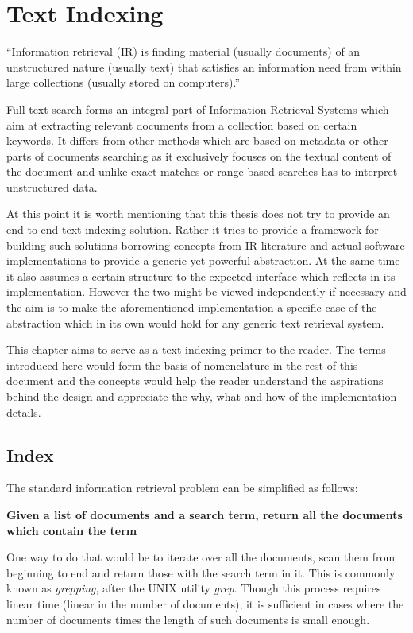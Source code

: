 \chapter{Text Indexing}
\label{chap:textIndexing}

``Information retrieval (IR) is finding material (usually documents) of an unstructured nature (usually text)
that satisfies an information need from within large collections (usually stored on computers).''\cite{IRBook}

Full text search forms an integral part of Information Retrieval Systems which aim at extracting
relevant documents from a collection based on certain keywords.
It differs from other methods which are based on metadata or other parts of documents searching as it exclusively focuses on the
textual content of the document and unlike exact matches or range based searches has to interpret unstructured data.

At this point it is worth mentioning that this thesis does not try to provide an end to end text indexing solution.
Rather it tries to provide a framework for building such solutions borrowing concepts from IR literature and actual software
implementations to provide a generic yet powerful abstraction.
At the same time it also assumes a certain structure to the expected interface which reflects in its implementation.
However the two might be viewed independently if necessary and the aim is to make the aforementioned implementation a specific
case of the abstraction which in its own would hold for any generic text retrieval system.

This chapter aims to serve as a text indexing primer to the reader.
The terms introduced here would form the basis of nomenclature in the rest of this document and
the concepts would help the reader understand the aspirations behind the design and appreciate the why, what and how
of the implementation details.

\section{Index}
The standard information retrieval problem can be simplified as follows:

\noindent \textbf{Given a list of documents and a search term, return all the documents which contain the term}

One way to do that would be to iterate over all the documents, scan them from beginning to end and return those with the search term in it.
This is commonly known as \textit{grepping}, after the UNIX utility \textit{grep}.
Though this process requires linear time (linear in the number of documents),
it is sufficient in cases where the number of documents times the length of such documents is small enough.

